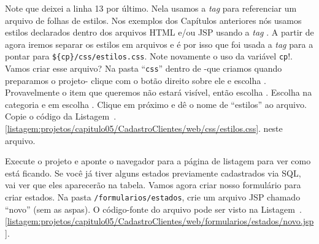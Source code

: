 Note que deixei a linha 13 por último. Nela usamos a \textit{tag}  para referenciar um arquivo de folhas de estilos. Nos exemplos dos Capítulos anteriores nós usamos estilos declarados dentro dos arquivos HTML e/ou JSP usando a \textit{tag} . A partir de agora iremos separar os estilos em arquivos e é por isso que foi usada a \textit{tag}  para a pontar para \texttt{\$\{cp\}/css/estilos.css}. Note novamente o uso da variável \texttt{cp}!. Vamos criar esse arquivo? Na pasta ``\texttt{css}'' dentro de  -que criamos quando preparamos o projeto- clique com o botão direito sobre ele e escolha . Provavelmente o item que queremos não estará visível, então escolha . Escolha  na categoria e em  escolha . Clique em próximo e dê o nome de ``estilos'' ao arquivo. Copie o código da Listagem~\thechapter.\ref{listagem:projetos/capitulo05/CadastroClientes/web/css/estilos.css}. neste arquivo.


Execute o projeto e aponte o navegador para a página de listagem para ver como está ficando. Se você já tiver alguns estados previamente cadastrados via SQL, vai ver que eles aparecerão na tabela. Vamos agora criar nosso formulário para criar estados. Na pasta \texttt{/formularios/estados}, crie um arquivo JSP chamado ``novo'' (sem as aspas). O código-fonte do arquivo pode ser visto na Listagem~\thechapter.\ref{listagem:projetos/capitulo05/CadastroClientes/web/formularios/estados/novo.jsp}.


